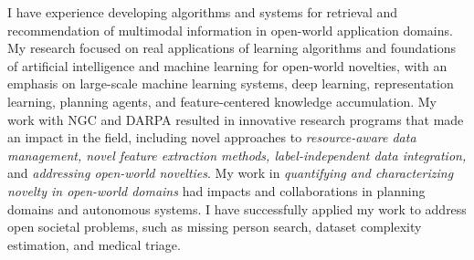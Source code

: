 \documentclass[9pt]{article}
\renewcommand*\paragraph[1]{}
\begin{document}
\paragraph{1 and P1) current research portfolio, accomplishments, and future research goals}

I have experience developing algorithms and systems for retrieval and recommendation of multimodal information in open-world application domains.
My research focused on real applications of learning algorithms and foundations of artificial intelligence and machine learning for open-world novelties, with an emphasis on large-scale machine learning systems, deep learning, representation learning, planning agents, and feature-centered knowledge accumulation. My work with NGC and DARPA resulted in innovative research programs that made an impact in the field, including novel approaches to \textit{resource-aware data management, novel feature extraction methods, label-independent data integration,} and \textit{addressing open-world novelties}. My work in \textit{quantifying and characterizing novelty in open-world domains} had impacts and collaborations in planning domains and autonomous systems. I have successfully applied my work to address open societal problems, such as missing person search, dataset complexity estimation, and medical triage.
\end{document}
